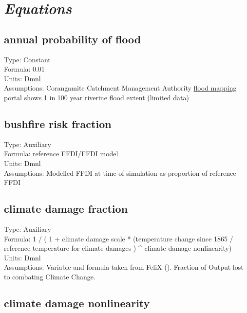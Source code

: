 \documentclass[
  11pt,
]{book}
\begin{document}
\hypertarget{equations-6}{%
\section{\texorpdfstring{\emph{Equations}}{Equations}}\label{equations-6}}

\hypertarget{annual-probability-of-flood}{%
\subsection{annual probability of flood}\label{annual-probability-of-flood}}

Type: Constant\\
Formula: 0.01\\
Units: Dmnl\\
Assumptions: Corangamite Catchment Management Authority \href{https://www.ccmaknowledgebase.vic.gov.au/flood/cb_pages/flood_mapping.php}{flood mapping portal} shows 1 in 100 year riverine flood extent (limited data)

\hypertarget{bushfire-risk-fraction}{%
\subsection{bushfire risk fraction}\label{bushfire-risk-fraction}}

Type: Auxiliary\\
Formula: reference FFDI/FFDI model\\
Units: Dmnl\\
Assumptions: Modelled FFDI at time of simulation as proportion of reference FFDI

\hypertarget{climate-damage-fraction}{%
\subsection{climate damage fraction}\label{climate-damage-fraction}}

Type: Auxiliary\\
Formula: 1 / ( 1 + climate damage scale * (temperature change since 1865 / reference temperature for climate damages ) \^{} climate damage nonlinearity)\\
Units: Dmnl\\
Assumptions: Variable and formula taken from FeliX (\citet{rydzak_impact_2010}). Fraction of Output lost to combating Climate Change.

\hypertarget{climate-damage-nonlinearity}{%
\subsection{climate damage nonlinearity}\label{climate-damage-nonlinearity}}
\end{document}
